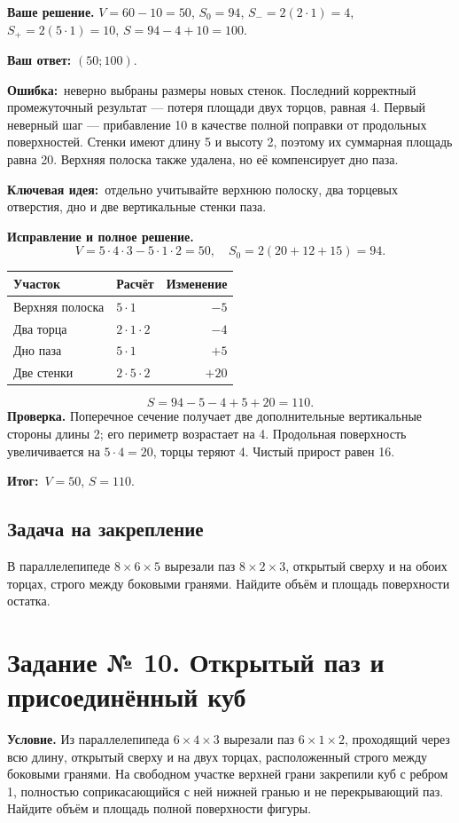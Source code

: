 \documentclass[a4paper,12pt]{article}
\newcommand{\err}{\textcolor{red!70!black}{\textbf{Ошибка:}}}
\newcommand{\idea}{\textcolor{blue!60!black}{\textbf{Ключевая идея:}}}
\newcommand{\result}{\textcolor{teal!60!black}{\textbf{Итог:}}}
\newcommand{\task}[2]{\clearpage\phantomsection\label{task:#1}\section*{Задание № #1. #2}}
\begin{document}
\textbf{Ваше решение.} $V=60-10=50$, $S_0=94$, $S_-=2(2\cdot1)=4$, $S_+=2(5\cdot1)=10$, $S=94-4+10=100$.

\textbf{Ваш ответ:} $(50;100)$.

\err\ неверно выбраны размеры новых стенок. Последний корректный промежуточный результат --- потеря площади двух торцов, равная 4. Первый неверный шаг --- прибавление 10 в качестве полной поправки от продольных поверхностей. Стенки имеют длину 5 и высоту 2, поэтому их суммарная площадь равна 20. Верхняя полоска также удалена, но её компенсирует дно паза.

\idea\ отдельно учитывайте верхнюю полоску, два торцевых отверстия, дно и две вертикальные стенки паза.

\textbf{Исправление и полное решение.}
\[V=5\cdot4\cdot3-5\cdot1\cdot2=50,\quad S_0=2(20+12+15)=94.\]
\begin{center}
\begin{tabular}{@{}llr@{}}\toprule Участок & Расчёт & Изменение\\\midrule
Верхняя полоска & $5\cdot1$ & $-5$\\
Два торца & $2\cdot1\cdot2$ & $-4$\\
Дно паза & $5\cdot1$ & $+5$\\
Две стенки & $2\cdot5\cdot2$ & $+20$\\\bottomrule\end{tabular}
\end{center}
\[S=94-5-4+5+20=110.\]
\textbf{Проверка.} Поперечное сечение получает две дополнительные вертикальные стороны длины 2; его периметр возрастает на 4. Продольная поверхность увеличивается на $5\cdot4=20$, торцы теряют 4. Чистый прирост равен 16.

\result\ $V=50$, $S=110$.
\subsection*{Задача на закрепление}
В параллелепипеде $8\times6\times5$ вырезали паз $8\times2\times3$, открытый сверху и на обоих торцах, строго между боковыми гранями. Найдите объём и площадь поверхности остатка.
\task{10}{Открытый паз и присоединённый куб}
\textbf{Условие.} Из параллелепипеда $6\times4\times3$ вырезали паз $6\times1\times2$, проходящий через всю длину, открытый сверху и на двух торцах, расположенный строго между боковыми гранями. На свободном участке верхней грани закрепили куб с ребром 1, полностью соприкасающийся с ней нижней гранью и не перекрывающий паз. Найдите объём и площадь полной поверхности фигуры.
\end{document}
